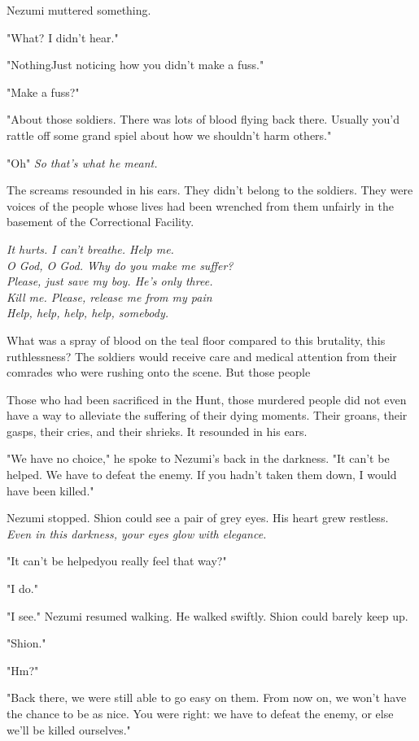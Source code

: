 Nezumi muttered something.

"What? I didn't hear."

"Nothing\el Just noticing how you didn't make a fuss."

"Make a fuss?"

"About those soldiers. There was lots of blood flying back there.
Usually you'd rattle off some grand spiel about how we shouldn't harm
others."

"Oh\el " \emph{So that's what he meant.}

The screams resounded in his ears. They didn't belong to the soldiers.
They were voices of the people whose lives had been wrenched from them
unfairly in the basement of the Correctional Facility.

\emph{It hurts. I can't breathe. Help me.\\
	O God, O God. Why do you make me suffer?\\
	Please, just save my boy. He's only three.\\
	Kill me. Please, release me from my pain\el \\
	Help, help, help, help, somebody.}

What was a spray of blood on the teal floor compared to this brutality,
this ruthlessness? The soldiers would receive care and medical attention
from their comrades who were rushing onto the scene. But those people\el 

Those who had been sacrificed in the Hunt, those murdered people did not
even have a way to alleviate the suffering of their dying moments. Their
groans, their gasps, their cries, and their shrieks. It resounded in his
ears.

"We have no choice," he spoke to Nezumi's back in the darkness. "It
can't be helped. We have to defeat the enemy. If you hadn't taken them
down, I would have been killed."

Nezumi stopped. Shion could see a pair of grey eyes. His heart grew
restless. \emph{Even in this darkness, your eyes glow with elegance.}

"It can't be helped\el you really feel that way?"

"I do."

"\el I see." Nezumi resumed walking. He walked swiftly. Shion could
barely keep up.

"Shion."

"Hm?"

"Back there, we were still able to go easy on them. From now on, we
won't have the chance to be as nice. You were right: we have to defeat
the enemy, or else we'll be killed ourselves."

